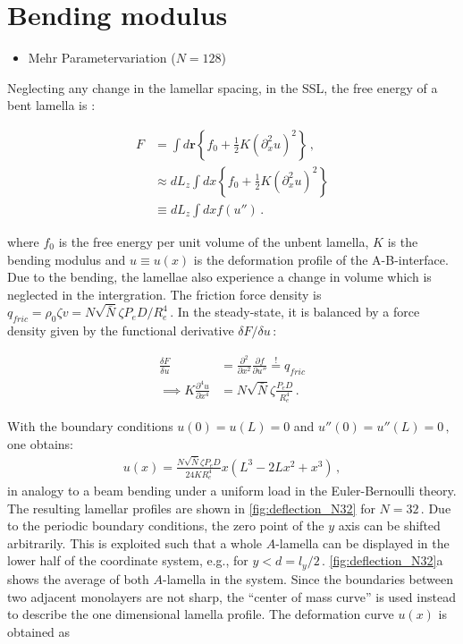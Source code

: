 \documentclass[bachelor,       %
               oneside,        %
               BCOR10mm,       %
               ngerman, english %
               ]{GAUBM}
\begin{document}
\section{Bending modulus}

\begin{itemize}
    \item Mehr Parametervariation ($N=128$)
\end{itemize}

Neglecting any change in the lamellar spacing, in the \ac{SSL}, the free energy of a bent lamella is \cite{wang94}:

\begin{align}
    F&=\int d\mathbf r\left\{f_0+\frac{1}{2}K \left(\partial_x^2 u\right)^2\right\}\,,\\
    &\approx dL_z\int dx\left\{f_0+\frac{1}{2}K \left(\partial_x^2 u\right)^2\right\}\nonumber\\
    &\equiv dL_z\int dxf(u'')\,.
    \label{eq:F_bend}
\end{align}

where $f_0$ is the free energy per unit volume of the unbent lamella, $K$ is the bending modulus and $u\equiv u(x)$ is the deformation profile of the A-B-interface. Due to the bending, the lamellae also experience a change in volume which is neglected in the intergration. The friction force density is $q_{fric}=\rho_0\zeta v=N\sqrt{\bar N}\zeta P_eD/R_e^4\,.$ In the steady-state, it is balanced by a force density given by the  functional derivative $\delta F/\delta u\,$:

\begin{align}
    \frac{\delta F}{\delta u}&=\frac{\partial^2}{\partial x^2}\frac{\partial f}{\partial u''}\overset{!}{=}q_{fric} \nonumber \\
    \implies K\frac{\partial^4u}{\partial x^4}&=N\sqrt{\bar N}\zeta\frac{P_eD}{R_e^4} \,.
\end{align}


With the boundary conditions $u(0)=u(L)=0$ and $u''(0)=u''(L)=0\,,$ one obtains:
\begin{align}
    u(x)=\frac{N\sqrt{\bar N}\zeta P_e D}{24KR_e^4}x(L^3-2Lx^2+x^3)\,,
    \label{eq:deflection}
\end{align}
in analogy to a beam bending under a uniform load in the Euler-Bernoulli theory. The resulting lamellar profiles are shown in \autoref{fig:deflection_N32} for $N=32\,.$ Due to the periodic boundary conditions, the zero point of the $y$ axis can be shifted arbitrarily. This is exploited such that a whole $A$-lamella can be displayed in the lower half of the coordinate system, e.g., for $y<d=l_y/2\,.$ \autoref{fig:deflection_N32}a shows the average of both $A$-lamella in the system. Since the boundaries between two adjacent monolayers are not sharp, the \enquote{center of mass curve} is used instead to describe the one dimensional lamella profile. The deformation curve $u(x)$ is obtained as
\end{document}
